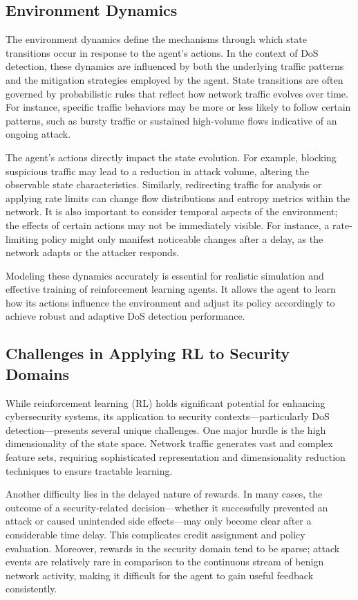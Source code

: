 \documentclass{report}
\begin{document}
\subsection{Environment Dynamics}

The environment dynamics define the mechanisms through which state transitions occur in response to the agent’s actions. In the context of DoS detection, these dynamics are influenced by both the underlying traffic patterns and the mitigation strategies employed by the agent. State transitions are often governed by probabilistic rules that reflect how network traffic evolves over time. For instance, specific traffic behaviors may be more or less likely to follow certain patterns, such as bursty traffic or sustained high-volume flows indicative of an ongoing attack.

The agent’s actions directly impact the state evolution. For example, blocking suspicious traffic may lead to a reduction in attack volume, altering the observable state characteristics. Similarly, redirecting traffic for analysis or applying rate limits can change flow distributions and entropy metrics within the network. It is also important to consider temporal aspects of the environment; the effects of certain actions may not be immediately visible. For instance, a rate-limiting policy might only manifest noticeable changes after a delay, as the network adapts or the attacker responds.

Modeling these dynamics accurately is essential for realistic simulation and effective training of reinforcement learning agents. It allows the agent to learn how its actions influence the environment and adjust its policy accordingly to achieve robust and adaptive DoS detection performance.



\subsection{Challenges in Applying RL to Security Domains}

While reinforcement learning (RL) holds significant potential for enhancing cybersecurity systems, its application to security contexts—particularly DoS detection—presents several unique challenges. One major hurdle is the high dimensionality of the state space. Network traffic generates vast and complex feature sets, requiring sophisticated representation and dimensionality reduction techniques to ensure tractable learning. 

Another difficulty lies in the delayed nature of rewards. In many cases, the outcome of a security-related decision—whether it successfully prevented an attack or caused unintended side effects—may only become clear after a considerable time delay. This complicates credit assignment and policy evaluation. Moreover, rewards in the security domain tend to be sparse; attack events are relatively rare in comparison to the continuous stream of benign network activity, making it difficult for the agent to gain useful feedback consistently.
\end{document}
